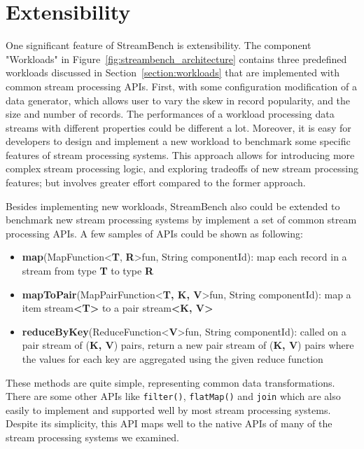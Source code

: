 \section{Extensibility}
\label{section:extensibility}

One significant feature of StreamBench is extensibility. The component "Workloads" in Figure~\ref{fig:streambench_architecture} contains three predefined workloads discussed in Section~\ref{section:workloads} that are implemented with common stream processing APIs. First, with some configuration modification of a data generator, which allows user to vary the skew in record popularity, and the size and number of records. The performances of a workload processing data streams with different properties could be different a lot. Moreover, it is easy for developers to design and implement a new workload to benchmark some specific features of stream processing systems. This approach allows for introducing more complex stream processing logic, and exploring tradeoffs of new stream processing features; but involves greater effort compared to the former approach.

Besides implementing new workloads, StreamBench also could be extended to benchmark new stream processing systems by implement a set of common stream processing APIs. A few samples of APIs could be shown as following:
\begin{itemize}
\item \textbf{map}(MapFunction\textless \textbf{T}, \textbf{R}\textgreater fun, String componentId): map each record in a stream from type \textbf{T} to type \textbf{R}
\item \textbf{mapToPair}(MapPairFunction\textless \textbf{T, K, V}\textgreater fun, String componentId): map a  item stream\textbf{\textless T\textgreater } to a pair stream\textbf{\textless K, V\textgreater}
\item \textbf{reduceByKey}(ReduceFunction\textless \textbf{V}\textgreater fun, String componentId): called on a pair stream of (\textbf{K, V}) pairs, return a new pair stream of (\textbf{K, V}) pairs where the values for each key are aggregated using the given reduce function
\end{itemize}

These methods are quite simple, representing common data transformations. There are some other APIs like \texttt{filter()}, \texttt{flatMap()} and \texttt{join} which are also easily to implement and supported well by most stream processing systems. Despite its simplicity, this API maps well to the native APIs of many of the stream processing systems we examined.





